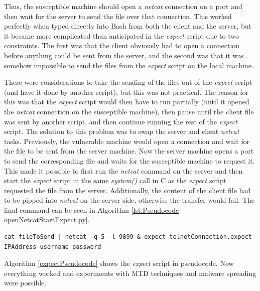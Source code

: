 Thus, the susceptible machine should open a \textit{netcat} connection on a port and then wait for the server to send the file over that connection. This worked perfectly when typed directly into Bash from both the client and the server, but it became more complicated than anticipated in the \textit{expect} script due to two constraints. The first was that the client obviously had to open a connection before anything could be sent from the server, and the second was that it was somehow impossible to send the files from the \textit{expect} script on the local machine. 

There were considerations to take the sending of the files out of the \textit{expect} script (and have it done by another script), but this was not practical. The reason for this was that the \textit{expect} script would then have to run partially (until it opened the \textit{netcat} connection on the susceptible machine), then pause until the client file was sent by another script, and then continue running the rest of the \textit{expect} script. The solution to this problem was to swap the server and client \textit{netcat} tasks. Previously, the vulnerable machine would open a connection and wait for the file to be sent from the server machine. Now the server machine opens a port to send the corresponding file and waits for the susceptible machine to request it. This made it possible to first run the \textit{netcat} command on the server and then start the \textit{expect} script in the same \textit{system()} call in C as the \textit{expect} script requested the file from the server.
Additionally, the content of the client file had to be pipped into \textit{netcat} on the server side, otherwise the transfer would fail. The final command can be seen in Algorithm \ref{lst:Pseudocode openNetcatStartExpect.py}.
\\


\begin{lstlisting}[caption={The Bash Command Used to Open a Netcat Connection From the Server to Send the File Once the Client Requested it and to Start the \textit{Expect} Script},label={lst:Pseudocode openNetcatStartExpect.py}]
cat fileToSend | netcat -q 5 -l 9899 & expect telnetConnection.expect IPAddress username password
\end{lstlisting}

Algorithm \ref{expectPseudocode} shows the \textit{expect} script in pseudocode. Now everything worked and experiments with MTD techniques and malware spreading were possible.
\\

